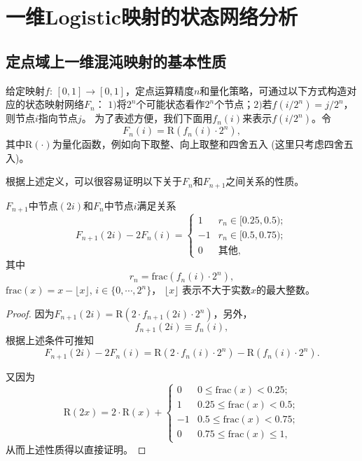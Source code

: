 \chapter{一维Logistic映射的状态网络分析}

\section{定点域上一维混沌映射的基本性质}

给定映射$f$: $[0, 1]\rightarrow [0, 1]$，定点运算精度$n$和量化策略，可通过以下方式构造对应的状态映射网络$F_n$：
$1)$将$2^n$个可能状态看作$2^n$个节点；$2)$若$f(i/2^n)=j/2^n$，则节点$i$指向节点$j$。
为了表述方便，我们下面用$f_n(i)$来表示$f(i/2^n)$。令
\begin{equation*}
F_n(i)=\mathrm{R}\left(f_n(i)\cdot 2^n\right),
\end{equation*}
其中$\mathrm{R}(\cdot)$为量化函数，例如向下取整、向上取整和四舍五入
(这里只考虑四舍五入)。

根据上述定义，可以很容易证明以下关于$F_n$和$F_{n+1}$之间关系的性质。
\begin{Property}
\label{prop:evenrelation}
$F_{n+1}$中节点$(2i)$和$F_{n}$中节点$i$满足关系
\begin{equation}
F_{n+1}(2i)-2F_n(i)=
\begin{cases}
1          &  r_n\in [0.25, 0.5); \\
-1         &  r_n\in [0.5, 0.75); \\
0          &  \text{其他},
\end{cases}
\label{even_condition2}
\end{equation}
其中
\begin{equation*}
r_n=\mathrm{frac}(f_{n}(i)\cdot 2^n),
\end{equation*}
$\mathrm{frac}(x)=x-\lfloor x\rfloor$, $i\in \{0, \cdots, 2^n\}$，
$\lfloor x\rfloor$ 表示不大于实数$x$的最大整数。
\end{Property}
\begin{proof}
因为$F_{n+1}(2i)=\mathrm{R}\left(2\cdot f_{n+1}(2i)\cdot 2^{n}\right)$，另外，
\begin{equation}
f_{n+1}(2i)\equiv f_n(i),
\end{equation}
根据上述条件可推知
\begin{equation*}
F_{n+1}(2i)-2F_n(i)=\mathrm{R}\left(2\cdot f_{n}(i)\cdot 2^{n}\right)-\mathrm{R}\left(f_{n}(i)\cdot 2^{n}\right).
\end{equation*}

又因为
\begin{equation*}
\mathrm{R}(2 x)=2\cdot \mathrm{R}(x)+
\begin{cases}
0   &  0    \le \mathrm{frac}(x)<0.25;\\
1   &  0.25 \le \mathrm{frac}(x)<0.5; \\
-1  &  0.5  \le \mathrm{frac}(x)<0.75;\\
0   &  0.75 \le \mathrm{frac}(x)\le 1,
\end{cases}
\label{con:error}
\end{equation*}
从而上述性质得以直接证明。\qedsymbol
\end{proof}

